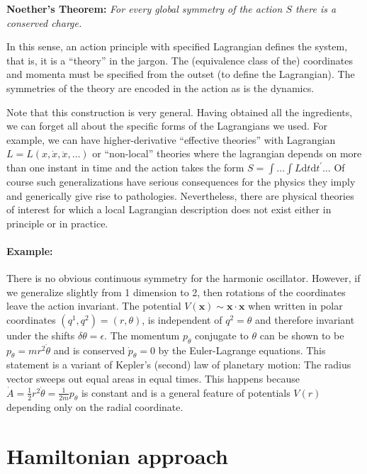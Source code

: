 \documentclass[12pt]{article}
\begin{document}
{\bf Noether's Theorem:} {\em For every global symmetry of the action $S$ there is a conserved charge.}

In this sense, an action principle with specified Lagrangian defines the system, that is, it is a ``theory'' in the jargon. The (equivalence class of the) coordinates and momenta must be specified from the outset (to define the Lagrangian). The symmetries of the theory are encoded in the action as is the dynamics. %

Note that this construction is very general. Having obtained all the ingredients, we can forget all about the specific forms of the Lagrangians we used. For example, we can have higher-derivative ``effective theories'' with Lagrangian $L=L(x, \dot x, \ddot x, \dots)$ or ``non-local'' theories where the lagrangian depends on more than one instant in time and the action takes the form $S=\int \dots \int  L \mathrm d t\mathrm dt^\prime\dots$ Of course such generalizations have serious consequences for the physics they imply and generically give rise to pathologies. Nevertheless, there are physical theories of interest for which a local Lagrangian description does not exist either in principle or in practice. 

\paragraph{Example:} There is no obvious continuous symmetry for the harmonic oscillator. However, if we generalize slightly from 1 dimension to 2, then rotations of the coordinates leave the action invariant. The potential $V(\mathbf x)\sim \mathbf x\cdot \mathbf x$ when written in polar coordinates $(q^1, q^2)=(r, \theta)$, is independent of $q^2=\theta$ and therefore invariant under the shifts $\delta \theta = \epsilon$. The momentum $p_\theta$ conjugate to $\theta$ can be shown to be $p_\theta= mr^2 \dot \theta$ and is conserved $\dot p_\theta=0$ by the Euler-Lagrange equations. This statement is a variant of Kepler's (second) law of planetary motion: The radius vector sweeps out equal areas in equal times. This happens because $\dot A=\frac12 r^2 \dot \theta=\frac 1{2m} p_\theta$ is constant and is a general feature of potentials $V(r)$ depending only on the radial coordinate.


\section{Hamiltonian approach}
\end{document}
